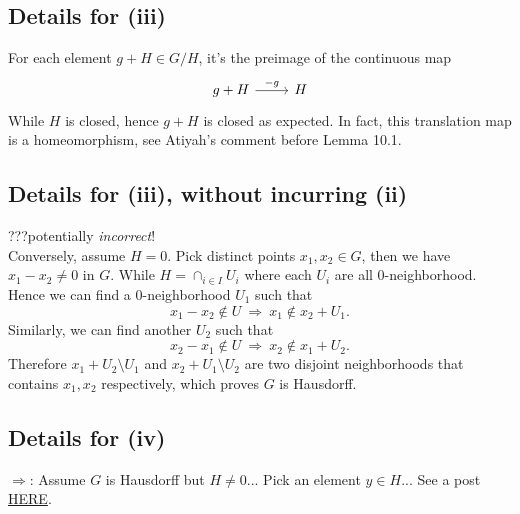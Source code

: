 \subsection{Details for (iii)}
For each element $g+H\in G/H$, it's the preimage of the continuous map
\[\begin{tikzcd}
	{g+H} & H
	\arrow["{-g}", from=1-1, to=1-2]
\end{tikzcd}\] While $H$ is closed, hence $g+H$ is closed as expected. In fact, this translation map is a homeomorphism, see Atiyah's comment before Lemma 10.1.

\subsection{Details for (iii), without incurring (ii)}
???potentially \textit{incorrect}!\\ Conversely, assume $H=0$. Pick distinct points $x_1,x_2\in G$, then we have $x_1-x_2\neq 0$ in $G$. 
While $H=\cap_{i\in I} U_i$ where each $U_i$ are all $0$-neighborhood. Hence we can find a $0$-neighborhood $U_1$ such that $$x_1-x_2\notin U ~\Rightarrow~ x_1\notin x_2+U_1.$$ 
Similarly, we can find another $U_2$ such that $$x_2-x_1\notin U ~\Rightarrow~ x_2\notin x_1+U_2.$$
Therefore $x_1+U_2\setminus U_1$ and $x_2+U_1\setminus U_2$ are two disjoint neighborhoods that contains $x_1,x_2$ respectively, which proves $G$ is Hausdorff.

\subsection{Details for (iv)}
$\Rightarrow$: Assume $G$ is Hausdorff but $H\neq 0$... Pick an element $y\in H$... See a post \href{URLhttps://math.stackexchange.com/questions/421109/questions-about-the-intersection-of-all-neighborhoods-of-0-in-a-topological-ab}{HERE}. 